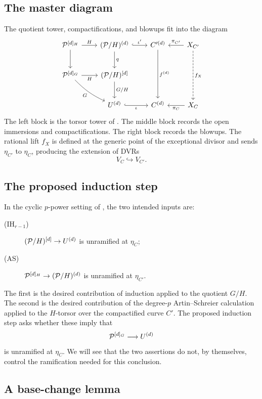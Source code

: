 \subsection{The master diagram}
\label{sec:master}

The quotient tower, compactifications, and blowups fit into the diagram
\[
\begin{tikzcd}[row sep=2.4em, column sep=2.2em]
\cP^{[d]_H}\ar[r,"H"]\ar[d]
  &(\cP/H)^{(d)}\ar[d,"q"]\ar[r,hookrightarrow,"\iota'"]
  &C'^{(d)}\ar[dd,"f^{(d)}"]
  &X_{C'}\ar[l,"\pi_{C'}"']\ar[dd,dashed,"f_X"]\\
\cP^{[d]_G}\ar[r,"H"']\ar[dr,"G"',bend right=10]
  &(\cP/H)^{[d]}\ar[d,"G/H"]
  &&\\
  &U^{(d)}\ar[r,hookrightarrow,"\iota"']
  &C^{(d)}
  &X_C\ar[l,"\pi_C"]
\end{tikzcd}
\]
The left block is the torsor tower of
. The middle block records the open
immersions and compactifications. The right block records the blowups. The
rational lift $f_X$ is defined at the generic point of the exceptional
divisor and sends $\eta_{C'}$ to $\eta_C$, producing the extension of DVRs
\[
V_C\hookrightarrow V_{C'}.
\]


\subsection{The proposed induction step}

In the cyclic $p$-power setting of , the
two intended inputs are:
\begin{description}
  \item[\textnormal{(IH$_{r-1}$)}]
    $(\mathcal{P}/H)^{[d]}\to U^{(d)}$ is unramified at $\eta_C$;
  \item[\textnormal{(AS)}]
    $\mathcal{P}^{[d]_H}\to(\mathcal{P}/H)^{(d)}$ is unramified at $\eta_{C'}$.
\end{description}
The first is the desired contribution of induction applied to the quotient
$G/H$. The second is the desired contribution of the degree-$p$
Artin--Schreier calculation applied to the $H$-torsor over the compactified
curve $C'$. The proposed induction step asks whether these imply that
\[
\mathcal{P}^{[d]_G}\longrightarrow U^{(d)}
\]
is unramified at $\eta_C$. We will see that the two assertions do not, by
themselves, control the ramification needed for this conclusion.


\subsection{A base-change lemma}

